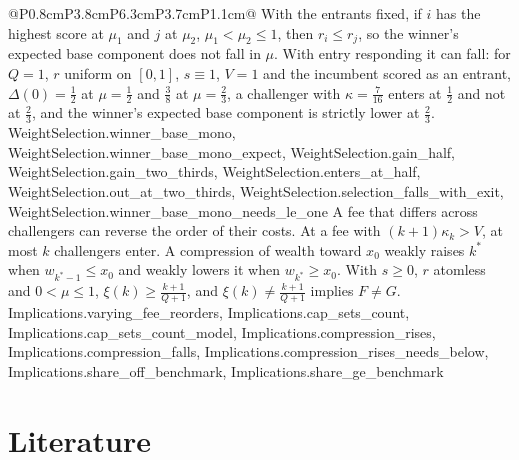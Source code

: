 \begin{longtable}{@{}P{0.8cm}P{3.8cm}P{6.3cm}P{3.7cm}P{1.1cm}@{}}
  {With the entrants fixed, if $i$ has the highest score at $\mu_1$ and $j$ at
  $\mu_2$, $\mu_1<\mu_2\le1$, then $r_i\le r_j$, so the winner's expected base
  component does not fall in $\mu$. With entry responding it can fall: for
  $Q=1$, $r$ uniform on $[0,1]$, $s\equiv1$, $V=1$ and the incumbent scored as
  an entrant, $\Delta(0)=\frac12$ at $\mu=\frac12$ and $\frac38$ at
  $\mu=\frac23$, a challenger with $\kappa=\frac7{16}$ enters at $\frac12$ and
  not at $\frac23$, and the winner's expected base component is strictly lower
  at $\frac23$.}
  {WeightSelection.winner_base_mono, WeightSelection.winner_base_mono_expect, WeightSelection.gain_half, WeightSelection.gain_two_thirds, WeightSelection.enters_at_half, WeightSelection.out_at_two_thirds, WeightSelection.selection_falls_with_exit, WeightSelection.winner_base_mono_needs_le_one}
  {A fee that differs across challengers can reverse the order of their costs.
  At a fee with $(k+1)\kappa_k>V$, at most $k$ challengers enter. A
  compression of wealth toward $x_0$ weakly raises $k^*$ when
  $w_{k^*-1}\le x_0$ and weakly lowers it when $w_{k^*}\ge x_0$. With $s\ge0$,
  $r$ atomless and $0<\mu\le1$, $\xi(k)\ge\frac{k+1}{Q+1}$, and
  $\xi(k)\ne\frac{k+1}{Q+1}$ implies $F\ne G$.}
  {Implications.varying_fee_reorders, Implications.cap_sets_count, Implications.cap_sets_count_model, Implications.compression_rises, Implications.compression_falls, Implications.compression_rises_needs_below, Implications.share_off_benchmark, Implications.share_ge_benchmark}
\end{longtable}
\normalsize

\section{Literature}
\label{sec:literature}

